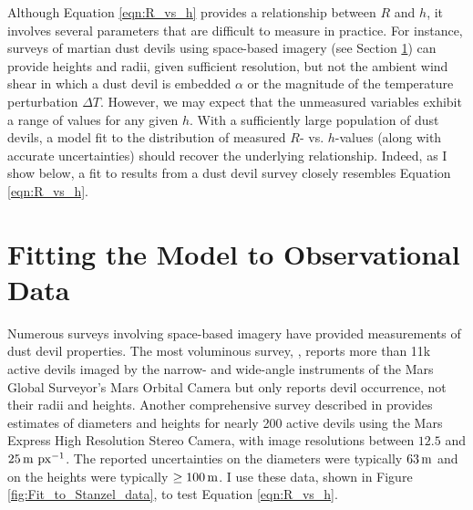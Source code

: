 \documentclass{aastex63}
\begin{document}

Although Equation \ref{eqn:R_vs_h} provides a relationship between $R$ and $h$, it involves several parameters that are difficult to measure in practice. For instance, surveys of martian dust devils using space-based imagery (see Section \ref{sec:fitting}) can provide heights and radii, given sufficient resolution, but not the ambient wind shear in which a dust devil is embedded $\alpha$ or the magnitude of the temperature perturbation $\Delta T$. However, we may expect that the unmeasured variables exhibit a range of values for any given $h$. With a sufficiently large population of dust devils, a model fit to the distribution of measured $R$- vs. $h$-values (along with accurate uncertainties) should recover the underlying relationship. Indeed, as I show below, a fit to results from a dust devil survey closely resembles Equation \ref{eqn:R_vs_h}.

\section{Fitting the Model to Observational Data}
\label{sec:fitting}
Numerous surveys involving space-based imagery have provided measurements of dust devil properties. The most voluminous survey, \citet{2006JGRE..11112002C}, reports more than 11k active devils imaged by the narrow- and wide-angle instruments of the Mars Global Surveyor's Mars Orbital Camera but only reports devil occurrence, not their radii and heights. Another comprehensive survey described in \citet{2008Icar..197...39S} provides estimates of diameters and heights for nearly 200 active devils using the Mars Express High Resolution Stereo Camera, with image resolutions between $12.5$ and $25\,{\rm m\ px^{-1}}$. The reported uncertainties on the diameters were typically $63\,{\rm m}$ and on the heights were typically $\ge 100\,{\rm m}$. I use these data, shown in Figure \ref{fig:Fit_to_Stanzel_data}, to test Equation \ref{eqn:R_vs_h}.
\end{document}
